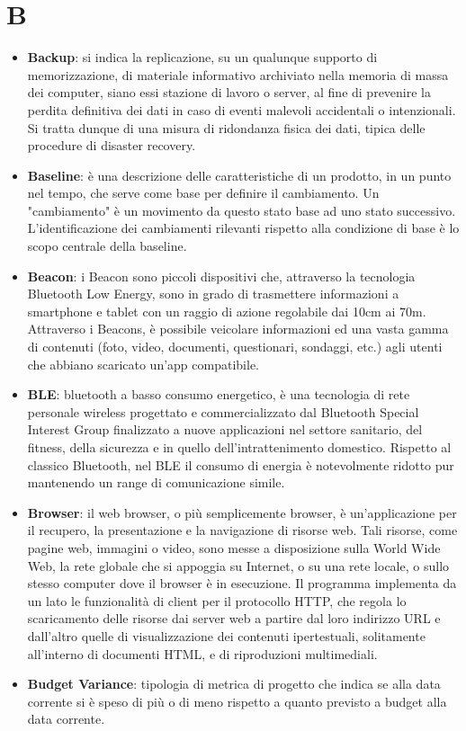 \section{B}
\begin{itemize} 
	\item
	\textbf{Backup}: si indica la replicazione, su un qualunque supporto di memorizzazione, di materiale informativo archiviato nella memoria di massa dei computer, siano essi stazione di lavoro o server, al fine di prevenire la perdita definitiva dei dati in caso di eventi malevoli accidentali o intenzionali. Si tratta dunque di una misura di ridondanza fisica dei dati, tipica delle procedure di disaster recovery.
	\item
	\textbf{Baseline}: è una descrizione delle caratteristiche di un prodotto, in un punto nel tempo, che serve come base per definire il cambiamento. Un "cambiamento" è un movimento da questo stato base ad uno stato successivo. L'identificazione dei cambiamenti rilevanti rispetto alla condizione di base è lo scopo centrale della baseline.
	\item
	\textbf{Beacon}: i Beacon sono piccoli dispositivi che, attraverso la tecnologia Bluetooth Low Energy, sono in grado di trasmettere informazioni a smartphone e tablet con un raggio di azione regolabile dai 10cm ai 70m. Attraverso i Beacons, è possibile veicolare informazioni ed una vasta gamma di contenuti (foto, video, documenti, questionari, sondaggi, etc.) agli utenti che abbiano scaricato un'app compatibile.
	\item
	\textbf{BLE}: bluetooth a basso consumo energetico, è una tecnologia di rete personale wireless progettato e commercializzato dal Bluetooth Special Interest Group finalizzato a nuove applicazioni nel settore sanitario, del fitness, della sicurezza e in quello dell'intrattenimento domestico. Rispetto al classico Bluetooth, nel BLE il consumo di energia è notevolmente ridotto pur mantenendo un range di comunicazione simile.
	\item
	\textbf{Browser}: il web browser, o più semplicemente browser, è un'applicazione per il recupero, la presentazione e la navigazione di risorse web. Tali risorse, come pagine web, immagini o video, sono messe a disposizione sulla World Wide Web, la rete globale che si appoggia su Internet, o su una rete locale, o sullo stesso computer dove il browser è in esecuzione. Il programma implementa da un lato le funzionalità di client per il protocollo HTTP, che regola lo scaricamento delle risorse dai server web a partire dal loro indirizzo URL e dall'altro quelle di visualizzazione dei contenuti ipertestuali, solitamente all'interno di documenti HTML, e di riproduzioni multimediali.
	\item
	\textbf{Budget Variance}: tipologia di metrica di progetto che indica se alla data corrente si è speso di più o di meno rispetto a quanto previsto a budget alla data corrente. 
	

\end{itemize}